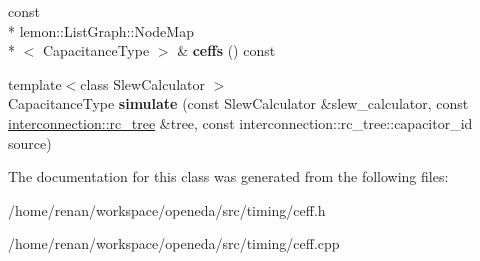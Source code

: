 \begin{DoxyCompactItemize}
\item 
\hypertarget{classophidian_1_1timing_1_1lumped__capacitance__wire__model_a0511d2310e1b4fb2857b7630e8fb2d4e}{const \\*
lemon\-::\-List\-Graph\-::\-Node\-Map\\*
$<$ Capacitance\-Type $>$ \& {\bfseries ceffs} () const }\label{classophidian_1_1timing_1_1lumped__capacitance__wire__model_a0511d2310e1b4fb2857b7630e8fb2d4e}

\item 
\hypertarget{classophidian_1_1timing_1_1lumped__capacitance__wire__model_a4a8142e1995284d2dbb798a43121fee9}{{\footnotesize template$<$class Slew\-Calculator $>$ }\\Capacitance\-Type {\bfseries simulate} (const Slew\-Calculator \&slew\-\_\-calculator, const \hyperlink{classophidian_1_1interconnection_1_1rc__tree}{interconnection\-::rc\-\_\-tree} \&tree, const interconnection\-::rc\-\_\-tree\-::capacitor\-\_\-id source)}\label{classophidian_1_1timing_1_1lumped__capacitance__wire__model_a4a8142e1995284d2dbb798a43121fee9}

\end{DoxyCompactItemize}


The documentation for this class was generated from the following files\-:\begin{DoxyCompactItemize}
\item 
/home/renan/workspace/openeda/src/timing/ceff.\-h\item 
/home/renan/workspace/openeda/src/timing/ceff.\-cpp\end{DoxyCompactItemize}
